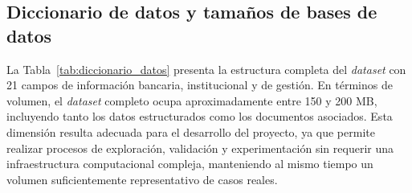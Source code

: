 \subsection{Diccionario de datos y tamaños de bases de datos}

La Tabla~\ref{tab:diccionario_datos} presenta la estructura completa del \textit{dataset} con 21 campos de información bancaria, institucional y de gestión. En términos de volumen, el \textit{dataset} completo ocupa aproximadamente entre 150 y 200 MB, incluyendo tanto los datos estructurados como los documentos asociados. Esta dimensión resulta adecuada para el desarrollo del proyecto, ya que permite realizar procesos de exploración, validación y experimentación sin requerir una infraestructura computacional compleja, manteniendo al mismo tiempo un volumen suficientemente representativo de casos reales.

